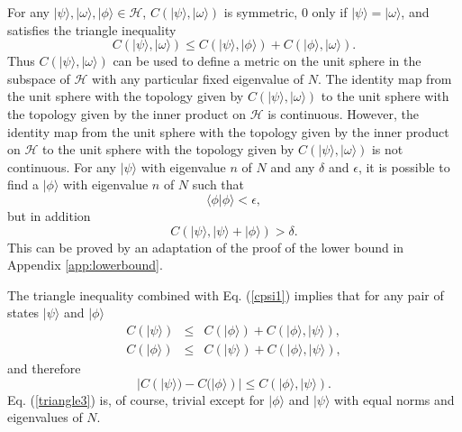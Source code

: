 \documentclass[twocolumn,amsmath,amssymb]{revtex4-1}
\begin{document}
For any $|\psi \rangle , |\omega \rangle , |\phi \rangle  \in \mathcal{H}$,
$C( |\psi \rangle , |\omega \rangle )$ is symmetric,
0 only if $|\psi \rangle  =|\omega \rangle $, and satisfies the triangle inequality
\begin{equation}
  \label{triangle}
  C( |\psi \rangle , |\omega \rangle ) \le C( |\psi \rangle , |\phi \rangle ) + C( |\phi \rangle , |\omega \rangle ).
\end{equation}
Thus $C( |\psi \rangle , |\omega \rangle )$ can be used to define a metric on the unit
sphere in the subspace of $\mathcal{H}$ with any particular fixed
eigenvalue of $N$. The identity map from the unit sphere with
the topology given by $C( |\psi \rangle , |\omega \rangle )$ to the unit sphere with
the topology given by the inner product on $\mathcal{H}$ is continuous.
However, the identity map from the unit sphere with
the topology given by the inner product on $\mathcal{H}$ to the unit sphere with
the topology given by $C( |\psi \rangle , |\omega \rangle )$ is not continuous.
For any $|\psi \rangle $ with eigenvalue $n$ of $N$ and any $\delta$ and $\epsilon$, it is possible to
find a $|\phi \rangle $ with eigenvalue $n$ of $N$
such that
\begin{equation}
  \label{epsilonupper}
   \langle  \phi | \phi \rangle  < \epsilon,
\end{equation}
but in addition
\begin{equation}
  \label{deltalower}
  C( |\psi \rangle , |\psi \rangle  + |\phi \rangle ) > \delta.
\end{equation}
This can be proved by an adaptation of the proof of the lower bound
in Appendix \ref{app:lowerbound}.

The triangle inequality combined with Eq. (\ref{cpsi1}) implies that
for any pair of states $|\psi \rangle $ and $|\phi \rangle $ 
\begin{subequations}
  \begin{eqnarray}
    \label{triangle1}
    C( |\psi \rangle ) &\le& C(|\phi \rangle ) + C(|\phi \rangle ,|\psi \rangle ), \\
    \label{triangle2}
    C( |\phi \rangle ) &\le& C(|\psi \rangle ) + C(|\phi \rangle ,|\psi \rangle ),
  \end{eqnarray}
\end{subequations}
and therefore 
\begin{equation}
    \label{triangle3}
    |C( |\psi \rangle ) - C(|\phi \rangle )| \le C(|\phi \rangle ,|\psi \rangle ).
\end{equation}
Eq. (\ref{triangle3}) is, of course, trivial except for
$|\phi \rangle $ and $|\psi \rangle $ with equal norms and eigenvalues of $N$.
\end{document}
